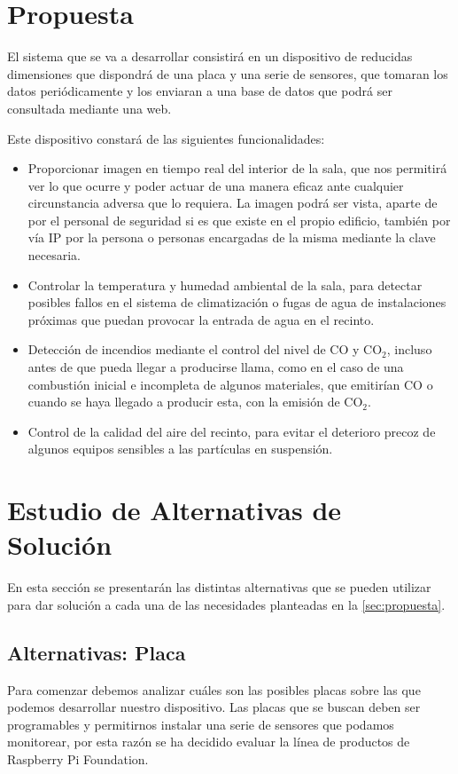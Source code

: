 \section{Propuesta}\label{sec:propuesta}
El sistema que se va a desarrollar consistirá en un dispositivo de reducidas dimensiones que dispondrá de una placa y una serie de sensores, que tomaran los datos periódicamente y los enviaran a una base de datos que podrá ser consultada mediante una web.

Este dispositivo constará de las siguientes funcionalidades:
\begin{itemize}
	\item Proporcionar imagen en tiempo real del interior de la sala, que nos permitirá ver lo que ocurre y poder actuar de una manera eficaz ante cualquier circunstancia adversa que lo requiera. La imagen podrá ser vista, aparte de por el personal de seguridad si es que existe en el propio edificio, también por vía IP por la persona o personas encargadas de la misma mediante la clave necesaria.
	\item Controlar la temperatura y humedad ambiental de la sala, para detectar posibles fallos en el sistema de climatización o fugas de agua de instalaciones próximas que puedan provocar la entrada de agua en el recinto.
	\item Detección de incendios mediante el control del nivel de CO y CO$_2$, incluso antes de que pueda llegar a producirse llama, como en el caso de una combustión inicial e incompleta de algunos materiales, que emitirían CO o cuando se haya llegado a producir esta, con la emisión de CO$_2$.
	\item Control de la calidad del aire del recinto, para evitar el deterioro precoz de algunos equipos sensibles a las partículas en suspensión.
\end{itemize}

\section{Estudio de Alternativas de Solución}\label{sec:estudio-de-alternativas-de-solución}
En esta sección se presentarán las distintas alternativas que se pueden utilizar para dar solución a cada una de las necesidades planteadas en la \autoref{sec:propuesta}.

\subsection{Alternativas: Placa}\label{subsec:altPlacas}
Para comenzar debemos analizar cuáles son las posibles placas sobre las que podemos desarrollar nuestro dispositivo. Las placas que se buscan deben ser programables y permitirnos instalar una serie de sensores que podamos monitorear, por esta razón se ha decidido evaluar la línea de productos de Raspberry Pi Foundation. 


